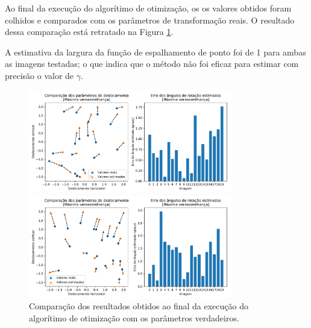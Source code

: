 Ao final da execução do algorítimo de otimização, os os valores obtidos foram
colhidos e comparados com os parâmetros de transformação reais. O resultado dessa
comparação está retratado na Figura \ref{fig:comparisson_plots}. 


A estimativa da largura da função de espalhamento de ponto foi de 1 para ambas as imagens testadas;
o que indica que o método não foi eficaz para estimar com precisão o valor de $\gamma$.


\begin{figure}
	\centering
	\caption{Comparação dos resultados obtidos ao final da execução do algorítimo de otimização com os parâmetros verdadeiros.}
	\label{fig:comparisson_plots}
	\begin{minipage}[b]{.99\linewidth}
		\centering
		\includegraphics[width=0.8\textwidth]{./figures/results_figures/comparisson_plot.pdf}
	\end{minipage}

	\begin{minipage}[b]{.99\linewidth}
		\centering
		\includegraphics[width=0.8\textwidth]{./figures/results_figures/comparisson_plot2.pdf}
		
	\end{minipage}
\end{figure} 

